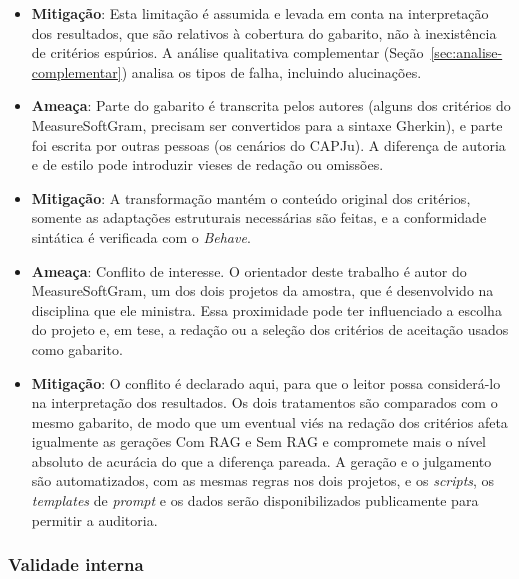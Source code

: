 \begin{itemize}
    \item \textbf{Mitigação}: Esta limitação é assumida e levada em conta na interpretação dos resultados, que são relativos à cobertura do gabarito, não à inexistência de critérios espúrios. A análise qualitativa complementar (Seção~\ref{sec:analise-complementar}) analisa os tipos de falha, incluindo alucinações.

    \item \textbf{Ameaça}: Parte do gabarito é transcrita pelos autores (alguns dos critérios do MeasureSoftGram, precisam ser convertidos para a sintaxe Gherkin), e parte foi escrita por outras pessoas (os cenários do CAPJu). A diferença de autoria e de estilo pode introduzir vieses de redação ou omissões.

    \item \textbf{Mitigação}: A transformação mantém o conteúdo original dos critérios, somente as adaptações estruturais necessárias são feitas, e a conformidade sintática é verificada com o \textit{Behave}.
    
    \item \textbf{Ameaça}: Conflito de interesse. O orientador deste trabalho é autor do MeasureSoftGram, um dos dois projetos da amostra, que é desenvolvido na disciplina que ele ministra. Essa proximidade pode ter influenciado a escolha do projeto e, em tese, a redação ou a seleção dos critérios de aceitação usados como gabarito.

    \item \textbf{Mitigação}: O conflito é declarado aqui, para que o leitor possa considerá-lo na interpretação dos resultados. Os dois tratamentos são comparados com o mesmo gabarito, de modo que um eventual viés na redação dos critérios afeta igualmente as gerações Com RAG e Sem RAG e compromete mais o nível absoluto de acurácia do que a diferença pareada. A geração e o julgamento são automatizados, com as mesmas regras nos dois projetos, e os \textit{scripts}, os \textit{templates} de \textit{prompt} e os dados serão disponibilizados publicamente para permitir a auditoria. 
\end{itemize}


\subsubsection*{Validade interna}

